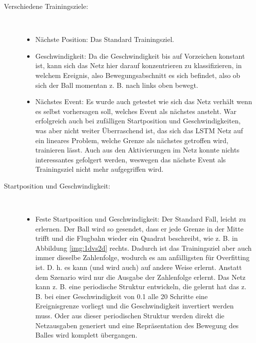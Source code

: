 \begin{description}
	\item[Verschiedene Trainingsziele:] \hfill \\
	\begin{itemize}
	
	\item Nächste Position: Das Standard Trainingsziel.
	\item Geschwindigkeit: Da die Geschwindigkeit bis auf Vorzeichen konstant ist, kann sich das Netz hier darauf konzentrieren zu klassifizieren, in welchem Ereignis, also Bewegungsabschnitt es sich befindet, also ob sich der Ball momentan z. B. nach links oben bewegt.  
	\item Nächstes Event: Es wurde auch getestet wie sich das Netz verhält wenn es selbst vorhersagen soll, welches Event als nächstes ansteht. War erfolgreich auch bei zufälligen Startposition und Geschwindigkeiten, was aber nicht weiter Überraschend ist, das sich das LSTM Netz auf ein lineares Problem, welche Grenze als nächstes getroffen wird, trainieren lässt. Auch aus den Aktivierungen im Netz konnte nichts interessantes gefolgert werden, weswegen das nächste Event als Trainingsziel nicht mehr aufgegriffen wird. 
	
\end{itemize}
	\item[Startposition und Geschwindigkeit:]\hfill \\
	\begin{itemize}
		\item Feste Startposition und Geschwindigkeit: Der Standard Fall, leicht zu erlernen. Der Ball wird so gesendet, dass er jede Grenze in der Mitte trifft und die Flugbahn wieder ein Quadrat beschreibt, wie z. B. in Abbildung \ref{img:1dvs2d} rechts. Dadurch ist das Trainingsziel aber auch immer dieselbe Zahlenfolge, wodurch es am anfälligsten für Overfitting ist. D. h. es kann (und wird auch) auf andere Weise erlernt. Anstatt dem Szenario wird nur die Ausgabe der Zahlenfolge erlernt. Das Netz kann z. B. eine periodische Struktur entwickeln, die gelernt hat das z. B. bei einer Geschwindigkeit von 0.1 alle 20 Schritte eine Ereignisgrenze vorliegt und die Geschwindigkeit invertiert werden muss. Oder aus dieser periodischen Struktur werden direkt die Netzausgaben generiert und eine Repräsentation des Bewegung des Balles wird komplett übergangen. 
		

\end{itemize}
\end{description}
